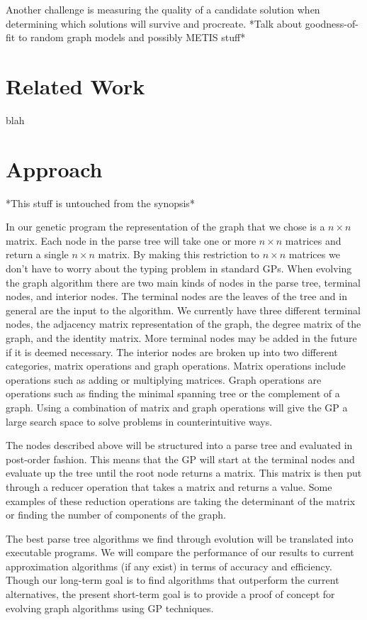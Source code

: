 \documentclass{article}
\begin{document}
Another challenge is measuring the quality of a candidate solution when determining which solutions will survive and procreate. *Talk about goodness-of-fit to random graph models and possibly METIS stuff*

\section{Related Work}
blah

\section{Approach}

*This stuff is untouched from the synopsis*

In our genetic program the representation of the graph that we chose is a $n \times n$ matrix. Each node in the parse tree will take one or more $n \times n$ matrices and return a single $n \times n$ matrix. By making this restriction to $n \times n$ matrices we don't have to worry about the typing problem in standard GPs.
When evolving the graph algorithm there are two main kinds of nodes in the parse tree, terminal nodes, and interior nodes. The terminal nodes are the leaves of the tree and in general are the input to the algorithm. We currently have three different terminal nodes, the adjacency matrix representation of the graph, the degree matrix of the graph, and the identity matrix. More terminal nodes may be added in the future if it is deemed necessary. The interior nodes are broken up into two different categories, matrix operations and graph operations. Matrix operations include operations such as adding or multiplying matrices. Graph operations are operations such as finding the minimal spanning tree or the complement of a graph. Using a combination of matrix and graph operations will give the GP a large search space to solve problems in counterintuitive ways.

The nodes described above will be structured into a parse tree and evaluated in post-order fashion. This means that the GP will start at the terminal nodes and evaluate up the tree until the root node returns a matrix. This matrix is then put through a reducer operation that takes a matrix and returns a value. Some examples of these reduction operations are taking the determinant of the matrix or finding the number of components of the graph.

The best parse tree algorithms we find through evolution will be translated into executable programs. We will compare the performance of our results to current approximation algorithms (if any exist) in terms of accuracy and efficiency. Though our long-term goal is to find algorithms that outperform the current alternatives, the present short-term goal is to provide a proof of concept for evolving graph algorithms using GP techniques.
\end{document}
